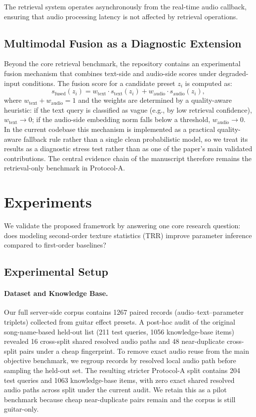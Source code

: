 The retrieval system operates asynchronously from the real-time audio callback, ensuring that audio processing latency is not affected by retrieval operations.

\subsection{Multimodal Fusion as a Diagnostic Extension}
\label{ssec:fusion}

Beyond the core retrieval benchmark, the repository contains an experimental fusion mechanism that combines text-side and audio-side scores under degraded-input conditions. The fusion score for a candidate preset $z_i$ is computed as:
\begin{equation}
	s_{\text{fused}}(z_i) = w_{\text{text}} \cdot s_{\text{text}}(z_i) + w_{\text{audio}} \cdot s_{\text{audio}}(z_i),
\end{equation}
where $w_{\text{text}} + w_{\text{audio}} = 1$ and the weights are determined by a quality-aware heuristic: if the text query is classified as vague (e.g., by low retrieval confidence), $w_{\text{text}} \to 0$; if the audio-side embedding norm falls below a threshold, $w_{\text{audio}} \to 0$. In the current codebase this mechanism is implemented as a practical quality-aware fallback rule rather than a single clean probabilistic model, so we treat its results as a diagnostic stress test rather than as one of the paper's main validated contributions. The central evidence chain of the manuscript therefore remains the retrieval-only benchmark in Protocol-A.

\section{Experiments}
\label{sec:experiments}

We validate the proposed framework by answering one core research question: does modeling second-order texture statistics (TRR) improve parameter inference compared to first-order baselines?

\subsection{Experimental Setup}

\paragraph{Dataset and Knowledge Base.}
Our full server-side corpus contains 1267 paired records (audio--text--parameter triplets) collected from guitar effect presets. A post-hoc audit of the original song-name-based held-out list (211 test queries, 1056 knowledge-base items) revealed 16 cross-split shared resolved audio paths and 48 near-duplicate cross-split pairs under a cheap fingerprint. To remove exact audio reuse from the main objective benchmark, we regroup records by resolved local audio path before sampling the held-out set. The resulting stricter Protocol-A split contains 204 test queries and 1063 knowledge-base items, with zero exact shared resolved audio paths across split under the current audit. We retain this as a pilot benchmark because cheap near-duplicate pairs remain and the corpus is still guitar-only.

